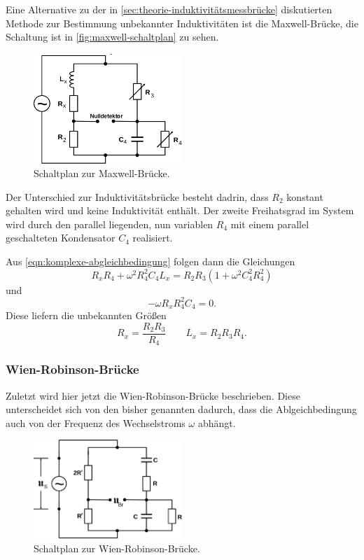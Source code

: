 Eine Alternative zu der in \autoref{sec:theorie-induktivitätsmessbrücke} diskutierten Methode zur
Bestimmung unbekannter Induktivitäten ist die Maxwell-Brücke, die Schaltung ist in 
\autoref{fig:maxwell-schaltplan} zu sehen.
\begin{figure}[H]
	\centering
	\includegraphics[width=0.5\textwidth]{bilder/maxwellbruecke.png}
	\caption{Schaltplan zur Maxwell-Brücke.}
	\label{fig:maxwell-schaltplan}
\end{figure}

Der Unterschied zur Induktivitätsbrücke besteht dadrin, dass $R_2$ konstant gehalten wird und keine 
Induktivität enthält. Der zweite Freihatsgrad im System wird durch den parallel liegenden, nun
variablen $R_4$ mit einem parallel geschalteten Kondensator $C_4$ realisiert.

Aus \autoref{eqn:komplexe-abgleichbedingung} folgen dann die Gleichungen
\begin{equation}
	R_x R_4 + \omega^2 R_4^2 C_4 L_x = R_2 R_3 \left(1 + \omega^2 C_4^2 R_4^2 \right)
	\label{eqn:maxwell-gleichung1}
\end{equation}
und
\begin{equation}
	-\omega R_x R_4^2 C_4 = 0.
	\label{eqn:maxwell-gleichung2}
\end{equation}
Diese liefern die unbekannten Größen
\begin{equation}
	R_x = \frac{R_2 R_3}{R_4}
	\qquad
	L_x = R_2 R_3 R_4.
	\label{eqn:kenngroessen-maxwell}
\end{equation}

\subsubsection{Wien-Robinson-Brücke}
\label{sec:theorie-wien-robinson-bruecke}
Zuletzt wird hier jetzt die Wien-Robinson-Brücke beschrieben. Diese unterscheidet sich von den 
bisher genannten dadurch, dass die Ablgeichbedingung auch von der Frequenz des Wechselstroms $\omega$
abhängt.
\begin{figure}[H]
	\centering
	\includegraphics[width=0.5\textwidth]{bilder/wien-robinson.png}
	\caption{Schaltplan zur Wien-Robinson-Brücke.}
	\label{fig:wien-robinson-schaltplan}
\end{figure}

